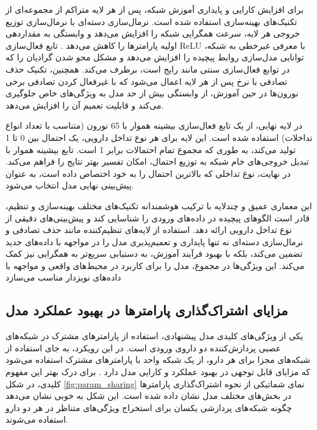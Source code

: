 برای افزایش کارایی و پایداری آموزش شبکه، پس از هر لایه متراکم از مجموعه‌ای از تکنیک‌های بهینه‌سازی استفاده شده است. نرمال‌سازی دسته‌ای با نرمال‌سازی توزیع خروجی هر لایه، سرعت همگرایی شبکه را افزایش می‌دهد و وابستگی به مقداردهی اولیه پارامترها را کاهش می‌دهد \cite{ref_dai2020}. تابع فعال‌سازی ReLU با معرفی غیرخطی به شبکه، توانایی مدل‌سازی روابط پیچیده را افزایش می‌دهد و مشکل محو شدن گرادیان را که در توابع فعال‌سازی سنتی مانند  رایج است، برطرف می‌کند. همچنین، تکنیک حذف تصادفی با نرخ  پس از هر لایه اعمال می‌شود که با غیرفعال کردن تصادفی برخی نورون‌ها در حین آموزش، از وابستگی بیش از حد مدل به ویژگی‌های خاص جلوگیری می‌کند و قابلیت تعمیم آن را افزایش می‌دهد.

در لایه نهایی، از یک تابع فعال‌سازی بیشینه هموار با 65 نورون (متناسب با تعداد انواع تداخلات) استفاده شده است. این لایه برای هر نوع تداخل دارویی، یک احتمال بین 0 تا 1 تولید می‌کند، به طوری که مجموع تمام احتمالات برابر 1 است. تابع بیشینه هموار با تبدیل خروجی‌های خام شبکه به توزیع احتمال، امکان تفسیر بهتر نتایج را فراهم می‌کند. در نهایت، نوع تداخلی که بالاترین احتمال را به خود اختصاص داده است، به عنوان پیش‌بینی نهایی مدل انتخاب می‌شود.

این معماری عمیق و چندلایه با ترکیب هوشمندانه تکنیک‌های مختلف بهینه‌سازی و تنظیم، قادر است الگوهای پیچیده در داده‌های ورودی را شناسایی کند و پیش‌بینی‌های دقیقی از نوع تداخل دارویی ارائه دهد. استفاده از لایه‌های تنظیم‌کننده مانند حذف تصادفی و نرمال‌سازی دسته‌ای نه تنها پایداری و تعمیم‌پذیری مدل را در مواجهه با داده‌های جدید تضمین می‌کند، بلکه با بهبود فرآیند آموزش، به دستیابی سریع‌تر به همگرایی نیز کمک می‌کند. این ویژگی‌ها در مجموع، مدل را برای کاربرد در محیط‌های واقعی و مواجهه با داده‌های نویزدار مناسب می‌سازد

\subsection{مزایای اشتراک‌گذاری پارامترها در بهبود عملکرد مدل}

یکی از ویژگی‌های کلیدی مدل پیشنهادی، استفاده از پارامترهای مشترک در شبکه‌های عصبی پردازش‌کننده دو داروی ورودی است. در این رویکرد، به جای استفاده از شبکه‌های مجزا برای هر دارو، از یک شبکه واحد با پارامترهای مشترک استفاده می‌شود که مزایای قابل توجهی در بهبود عملکرد و کارایی مدل دارد \cite{ref_dai2020}. برای درک بهتر این مفهوم کلیدی، در شکل \ref{fig:param_sharing} نمای شماتیکی از نحوه اشتراک‌گذاری پارامترها در بخش‌های مختلف مدل نشان داده شده است. این شکل به خوبی نشان می‌دهد چگونه شبکه‌های پردازشی یکسان برای استخراج ویژگی‌های متناظر در هر دو دارو استفاده می‌شوند.

